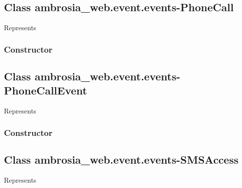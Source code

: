 \documentclass[letterpaper,10pt,english]{sphinxmanual}
\begin{document}
\subsection{Class ambrosia\_web.event.events-PhoneCall}
\label{ambrosia_web.event.events-PhoneCall:class-ambrosia-web-event-events-phonecall}\label{ambrosia_web.event.events-PhoneCall::doc}
Represents 


\subsubsection{Constructor}
\label{ambrosia_web.event.events-PhoneCall:constructor}

\begin{fulllineitems}
\label{ambrosia_web.event.events-PhoneCall:ambrosia_web.event.events-PhoneCall}
\end{fulllineitems}



\subsection{Class ambrosia\_web.event.events-PhoneCallEvent}
\label{ambrosia_web.event.events-PhoneCallEvent:class-ambrosia-web-event-events-phonecallevent}\label{ambrosia_web.event.events-PhoneCallEvent::doc}
Represents {\hyperref[ambrosia_plugins.apimonitor:ambrosia_plugins.apimonitor.PhoneCallEvent]{}}


\subsubsection{Constructor}
\label{ambrosia_web.event.events-PhoneCallEvent:constructor}

\begin{fulllineitems}
\label{ambrosia_web.event.events-PhoneCallEvent:ambrosia_web.event.events-PhoneCallEvent}
\end{fulllineitems}



\subsection{Class ambrosia\_web.event.events-SMSAccess}
\label{ambrosia_web.event.events-SMSAccess:class-ambrosia-web-event-events-smsaccess}\label{ambrosia_web.event.events-SMSAccess::doc}
Represents 
\end{document}
